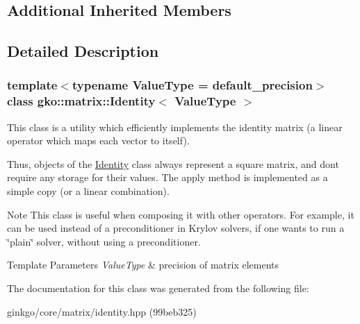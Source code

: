 \subsection*{Additional Inherited Members}


\subsection{Detailed Description}
\subsubsection*{template$<$typename Value\+Type = default\+\_\+precision$>$\newline
class gko\+::matrix\+::\+Identity$<$ Value\+Type $>$}

This class is a utility which efficiently implements the identity matrix (a linear operator which maps each vector to itself). 

Thus, objects of the \hyperlink{classgko_1_1matrix_1_1Identity}{Identity} class always represent a square matrix, and don\textquotesingle{}t require any storage for their values. The apply method is implemented as a simple copy (or a linear combination).

\begin{DoxyNote}{Note}
This class is useful when composing it with other operators. For example, it can be used instead of a preconditioner in Krylov solvers, if one wants to run a \char`\"{}plain\char`\"{} solver, without using a preconditioner.
\end{DoxyNote}

\begin{DoxyTemplParams}{Template Parameters}
{\em Value\+Type} & precision of matrix elements \\
\hline
\end{DoxyTemplParams}


The documentation for this class was generated from the following file\+:\begin{DoxyCompactItemize}
\item 
ginkgo/core/matrix/identity.\+hpp (99beb325)\end{DoxyCompactItemize}

